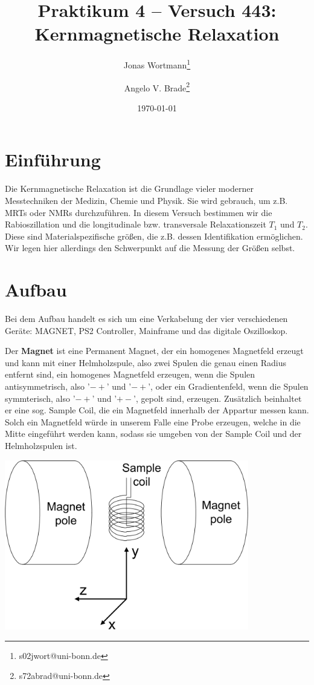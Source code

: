 \documentclass[10pt]{article}
\title{Praktikum 4 -- Versuch 443: Kernmagnetische Relaxation}
\author[1]{Jonas Wortmann\thanks{s02jwort@uni-bonn.de}}
\author[1]{Angelo V. Brade\thanks{s72abrad@uni-bonn.de}}
\affil[1]{Rheinische Friedrich-Wilhelms-Universität Bonn}
\date{\today}
\newenvironment{Figure}
  {\par\medskip\noindent\minipage{\linewidth}}
  {\endminipage\par\medskip}
\begin{document}
\maketitle
\newpage

\tableofcontents
\newpage


\pagestyle{fancy}
\fancyhead[R]{\thepage}
\fancyhead[L]{\leftmark}


\begin{multicols}{2}
  \section{Einführung}
  Die Kernmagnetische Relaxation ist die Grundlage vieler moderner Messtechniken der Medizin, Chemie und Physik. Sie wird gebrauch, um z.B. MRTs oder NMRs durchzuführen. In diesem Versuch bestimmen wir die Rabioszillation und die longitudinale bzw. transversale Relaxationszeit $T_1$ und $T_2$. Diese sind Materialspezifische größen, die z.B. dessen Identifikation ermöglichen. Wir legen hier allerdings den Schwerpunkt auf die Messung der Größen selbst.
  \section{Aufbau}
  Bei dem Aufbau handelt es sich um eine Verkabelung der vier verschiedenen Geräte: MAGNET, PS2 Controller, Mainframe und das digitale Oszilloskop.
  
  Der \textbf{Magnet} ist eine Permanent Magnet, der ein homogenes Magnetfeld erzeugt und kann mit einer Helmholzspule, also zwei Spulen die genau einen Radius entfernt sind, ein homogenes Magnetfeld erzeugen, wenn die Spulen antisymmetrisch, also '$-+$' und '$-+$', oder ein Gradientenfeld, wenn die Spulen symmterisch, also '$-+$' und '$+-$', gepolt sind, erzeugen. Zusätzlich beinhaltet er eine sog. Sample Coil, die ein Magnetfeld innerhalb der Appartur messen kann. Solch ein Magnetfeld würde in unserem Falle eine Probe erzeugen, welche in die Mitte eingeführt werden kann, sodass sie umgeben von der Sample Coil und der Helmholzspulen ist.
\begin{Figure}
		\centering\includegraphics[width=0.8\textwidth]{magnet_aufbau.png}
		\label{fig:alu}
	\end{Figure}


\end{multicols}
\end{document}

